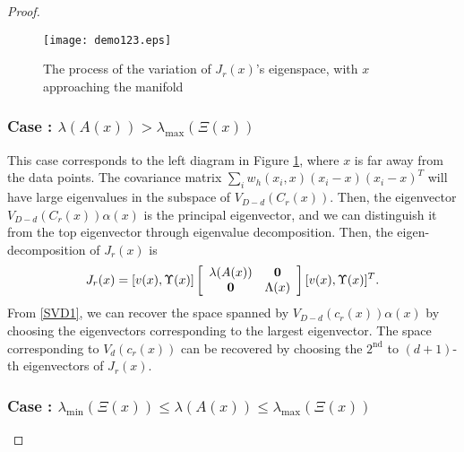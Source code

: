 \documentclass[aos,preprint]{imsart}
\theoremstyle{remark}
\begin{document}
\begin{appendix}
\begin{proof}
\begin{figure}[t] %
\texttt{[image: demo123.eps]} 
\caption{The process of the variation of $J_r(x)$'s eigenspace, with $x$ approaching the manifold}
\label{Shifting Eigenvectors}
\end{figure}

\subsubsection*{Case : $\lambda(A(x))>\lambda_{\max} (\Xi(x))$}

This case corresponds to the left diagram in {Figure \ref{Shifting Eigenvectors}}, where $x$ is far away from the data points. The covariance matrix $\sum_i w_h(x_i, x)(x_i-x)(x_i-x)^T$ will have large eigenvalues in the subspace of $V_{D-d}(C_r(x))$. Then, the eigenvector $V_{D-d}(C_r(x))\alpha(x)$ is the principal eigenvector, and we can distinguish it from the top eigenvector through eigenvalue decomposition.
Then, the eigen-decomposition of $J_r(x)$ is
\begin{equation}\label{SVD1}
J_r (x)= [v(x), \Upsilon(x)] 
\left[
\begin{array}{cc}
\lambda(A(x)) & \bf 0\\
\bf 0 &\Lambda(x)
\end{array}
\right][v(x), \Upsilon(x)]^T.
\end{equation}
From \eqref{SVD1}, we can recover the space spanned by $V_{D-d}(c_r(x))\alpha(x)$ by choosing the eigenvectors corresponding to the largest eigenvector. The space corresponding to $V_d(c_r(x))$ can be recovered by choosing the $2^{\mbox{nd}}$ to $(d+1)$-th eigenvectors of $J_r(x)$.

\subsubsection*{Case : $\lambda_{\min} (\Xi(x)) \leq \lambda(A(x))\leq \lambda_{\max} (\Xi(x))$}


\end{proof}
\end{appendix}
\end{document}
